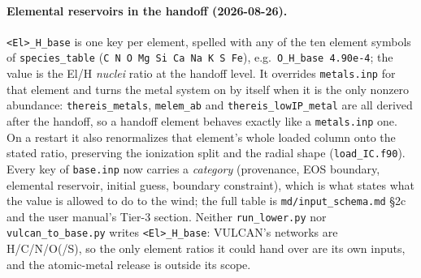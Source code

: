 \documentclass[english,a4paper]{my_memo}
\begin{document}
\paragraph{Elemental reservoirs in the handoff (2026-08-26).}
\texttt{<El>\_H\_base} is one key per element, spelled with any of the ten
element symbols of \texttt{species\_table} (\texttt{C N O Mg Si Ca Na K S Fe}),
e.g.\ \texttt{O\_H\_base 4.90e-4}; the value is the El/H \emph{nuclei} ratio at
the handoff level. It overrides \texttt{metals.inp} for that element and turns
the metal system on by itself when it is the only nonzero abundance:
\texttt{thereis\_metals}, \texttt{melem\_ab} and \texttt{thereis\_lowIP\_metal}
are all derived after the handoff, so a handoff element behaves exactly like a
\texttt{metals.inp} one. On a restart it also renormalizes that element's whole
loaded column onto the stated ratio, preserving the ionization split and the
radial shape (\texttt{load\_IC.f90}). Every key of \texttt{base.inp} now carries
a \emph{category} (provenance, EOS boundary, elemental reservoir, initial
guess, boundary constraint), which is what states what the value is allowed to
do to the wind; the full table is \texttt{md/input\_schema.md} \S2c and the
user manual's Tier-3 section. Neither \texttt{run\_lower.py} nor
\texttt{vulcan\_to\_base.py} writes \texttt{<El>\_H\_base}: VULCAN's networks are
H/C/N/O(/S), so the only element ratios it could hand over are its own inputs,
and the atomic-metal release is outside its scope.
\end{document}
